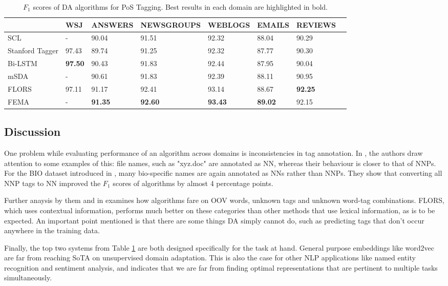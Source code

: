 \documentclass[12pt]{report}
\begin{document}
	\begin{table}[h]
		\caption{$F_{1}$ scores of DA algorithms for PoS Tagging. Best results in each domain are highlighted in bold.}
		\label{pos_results}
		\begin{tabular}{|l|l|l|l|l|l|l|l|}
			\hline
			& WSJ   & ANSWERS & NEWSGROUPS & WEBLOGS & EMAILS & REVIEWS \\
			\hline
			SCL             & -     & 90.04   & 91.51      & 92.32   & 88.04  & 90.29   \\
			\hline
			Stanford Tagger & 97.43  & 89.74   & 91.25      & 92.32   & 87.77  & 90.30   \\
			\hline
			Bi-LSTM         & \textbf{97.50}   & 90.43   & 91.83      & 92.44   & 87.95  & 90.04   \\
			\hline
			mSDA            & -       & 90.61   & 91.83      & 92.39   & 88.11  & 90.95   \\
			\hline
			FLORS           & 97.11  & 91.17   & 92.41      & 93.14   & 88.67  & \textbf{92.25}   \\
			\hline
			FEMA            & -       & \textbf{91.35}   & \textbf{92.60}      & \textbf{93.43}   & \textbf{89.02}  & 92.15  \\
			\hline
		\end{tabular}
	\end{table} 
	
	\subsection{Discussion}
	One problem while evaluating performance of an algorithm across domains is inconsistencies in tag annotation. In \citep{schnabel2014flors}, the authors draw attention to some examples of this: file names, such as "xyz.doc" are annotated as NN, whereas their behaviour is closer to that of NNPs. For the BIO dataset introduced in \citep{blitzer2006domain}, many bio-specific names are again annotated as NNs rather than NNPs. They show that converting all NNP tags to NN improved the $F_{1}$ scores of algorithms by almost 4 percentage points. 
	\par Further anaysis by them and in \citep{ruder2018strong} examines how algorithms fare on OOV words, unknown tags and unknown word-tag combinations. FLORS, which uses contextual information, performs much better on these categories than other methods that use lexical information, as is to be expected. An important point mentioned is that there are some things DA simply cannot do, such as predicting tags that don't occur anywhere in the training data.
	\par Finally, the top two systems from Table \ref{pos_results} are both designed specifically for the task at hand. General purpose embeddings like word2vec are far from reaching SoTA on unsupervised domain adaptation. This is also the case for other NLP applications like named entity recognition and sentiment analysis, and indicates that we are far from finding optimal representations that are pertinent to multiple tasks simultaneously.
	
\end{document}
